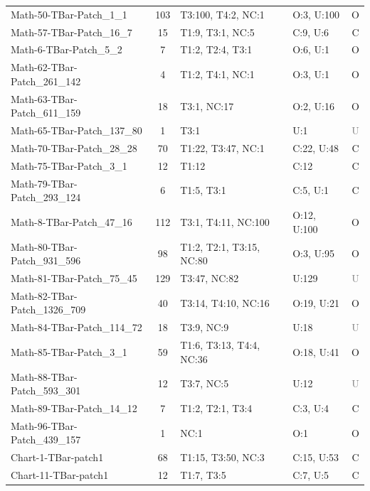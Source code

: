 \begin{table}[t]
\begin{tabular}{l|c|l|l|c}
Math-50-TBar-Patch\_1\_1 & 103 & T3:100, T4:2, NC:1 & O:3, U:100 & \textcolor{green!60!black}{O} \\
Math-57-TBar-Patch\_16\_7 & 15 & T1:9, T3:1, NC:5 & C:9, U:6 & \textcolor{green!60!black}{C} \\
Math-6-TBar-Patch\_5\_2 & 7 & T1:2, T2:4, T3:1 & O:6, U:1 & \textcolor{green!60!black}{O} \\
Math-62-TBar-Patch\_261\_142 & 4 & T1:2, T4:1, NC:1 & O:3, U:1 & \textcolor{green!60!black}{O} \\
Math-63-TBar-Patch\_611\_159 & 18 & T3:1, NC:17 & O:2, U:16 & \textcolor{green!60!black}{O} \\
Math-65-TBar-Patch\_137\_80 & 1 & T3:1 & U:1 & \textcolor{gray}{U} \\
Math-70-TBar-Patch\_28\_28 & 70 & T1:22, T3:47, NC:1 & C:22, U:48 & \textcolor{green!60!black}{C} \\
Math-75-TBar-Patch\_3\_1 & 12 & T1:12 & C:12 & \textcolor{green!60!black}{C} \\
Math-79-TBar-Patch\_293\_124 & 6 & T1:5, T3:1 & C:5, U:1 & \textcolor{green!60!black}{C} \\
Math-8-TBar-Patch\_47\_16 & 112 & T3:1, T4:11, NC:100 & O:12, U:100 & \textcolor{green!60!black}{O} \\
Math-80-TBar-Patch\_931\_596 & 98 & T1:2, T2:1, T3:15, NC:80 & O:3, U:95 & \textcolor{green!60!black}{O} \\
Math-81-TBar-Patch\_75\_45 & 129 & T3:47, NC:82 & U:129 & \textcolor{gray}{U} \\
Math-82-TBar-Patch\_1326\_709 & 40 & T3:14, T4:10, NC:16 & O:19, U:21 & \textcolor{green!60!black}{O} \\
Math-84-TBar-Patch\_114\_72 & 18 & T3:9, NC:9 & U:18 & \textcolor{gray}{U} \\
Math-85-TBar-Patch\_3\_1 & 59 & T1:6, T3:13, T4:4, NC:36 & O:18, U:41 & \textcolor{green!60!black}{O} \\
Math-88-TBar-Patch\_593\_301 & 12 & T3:7, NC:5 & U:12 & \textcolor{gray}{U} \\
Math-89-TBar-Patch\_14\_12 & 7 & T1:2, T2:1, T3:4 & C:3, U:4 & \textcolor{green!60!black}{C} \\
Math-96-TBar-Patch\_439\_157 & 1 & NC:1 & O:1 & \textcolor{green!60!black}{O} \\
Chart-1-TBar-patch1 & 68 & T1:15, T3:50, NC:3 & C:15, U:53 & \textcolor{green!60!black}{C} \\
Chart-11-TBar-patch1 & 12 & T1:7, T3:5 & C:7, U:5 & \textcolor{green!60!black}{C} \\

\end{tabular}
\end{table}
